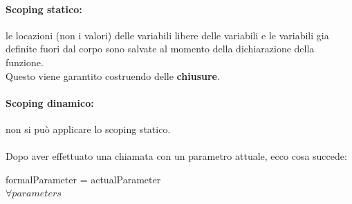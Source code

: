 \documentclass[a4paper,12pt]{article}
\begin{document}
\paragraph{Scoping statico: } le locazioni (non i valori) delle variabili libere delle variabili e le variabili gia definite fuori dal corpo sono salvate al momento della dichiarazione della funzione.\\
Questo viene garantito costruendo delle \textbf{chiusure}.
\paragraph{Scoping dinamico: } non si può applicare lo scoping statico.\\\\
Dopo aver effettuato una chiamata con un parametro attuale, ecco cosa succede:
\begin{center}
  formalParameter = actualParameter\\
  $\forall parameters$
\end{center}
\end{document}
